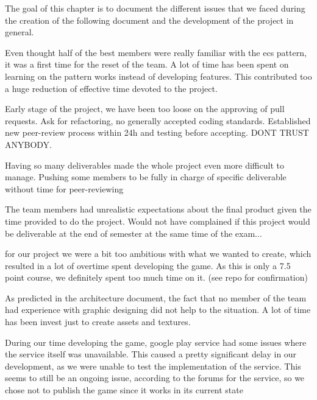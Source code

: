 The goal of this chapter is to document the different issues that we faced during the creation of the following document and the development of the project in general.

Even thought half of the best members were really familiar with the \gls{ecs} pattern, it was a first time for the reset of the team. A lot of time has been spent on learning on the pattern works instead of developing features. This contributed too a huge reduction of effective time devoted to the project.

Early stage of the project, we have been too loose on the approving of pull requests. Ask for refactoring, no generally accepted coding standards. Established new peer-review process within 24h and testing before accepting. DONT TRUST ANYBODY.

Having so many deliverables made the whole project even more difficult to manage. Pushing some members to be fully in charge of specific deliverable without time for peer-reviewing

The team members had unrealistic expectations about the final product given the time provided to do the project. Would not have complained if this project would be deliverable at the end of semester at the same time of the exam...

for our project we were a bit too ambitious with what we wanted to create, which resulted in a lot of overtime spent developing the game. As this is only a 7.5 point course, we definitely spent too much time on it. (see repo for confirmation)

As predicted in the architecture document, the fact that no member of the team had experience with graphic designing did not help to the situation. A lot of time has been invest just to create assets and textures.

During our time developing the game, google play service had some issues where the service itself was unavailable. This caused a pretty significant delay in our development, as we were unable to test the implementation of the service. This seems to still be an ongoing issue, according to the forums for the service, so we chose not to publish the game since it works in its current state
